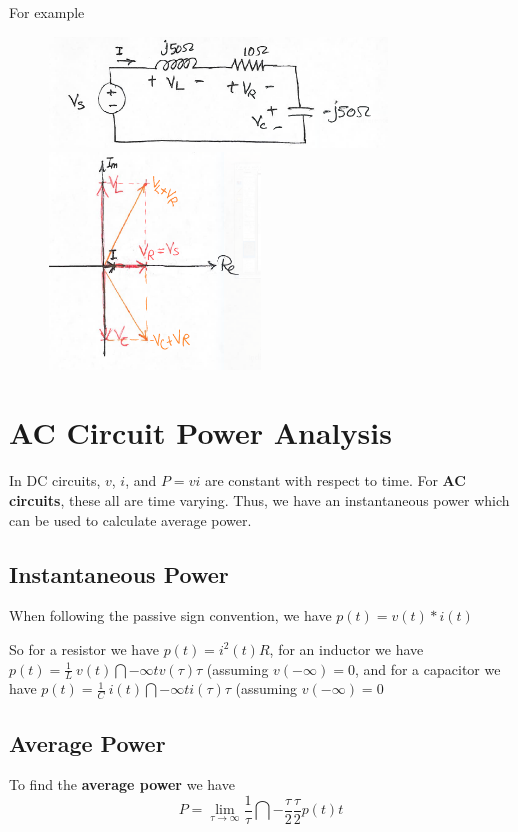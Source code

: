 \documentclass[12pt]{article}
\begin{document}
For example
\begin{figure}[ht]
\centering
\includegraphics[width=0.8\textwidth]{samplecircuit.png}
\includegraphics[width=0.5\textwidth]{samplecircuitsolved.png}
\end{figure}

\section*{AC Circuit Power Analysis}
In DC circuits, $v$, $i$, and $P = vi$ are constant with respect to time. For {\bf AC circuits}, these all are time varying. Thus, we have an instantaneous power which can be used to calculate average power.

\subsection*{Instantaneous Power}
When following the passive sign convention, we have $p(t) = v(t) * i(t)$

So for a resistor we have $p(t) = i^2(t)R$, for an inductor we have $p(t) = \frac{1}{L}\ v(t)\dint{-\infty}{t}{v(\tau)}{\tau}$ (assuming $v(-\infty) = 0$, and for a capacitor we have $p(t) = \frac{1}{C}\ i(t)\dint{-\infty}{t}{i(\tau)}{\tau}$ (assuming $v(-\infty) = 0$

\subsection*{Average Power}
To find the {\bf average power} we have \[ P = \lim_{\tau\to\infty} \frac{1}{\tau} \dint{-\frac{\tau}{2}}{\frac{\tau}{2}}{p(t)}{t} \]
\end{document}
